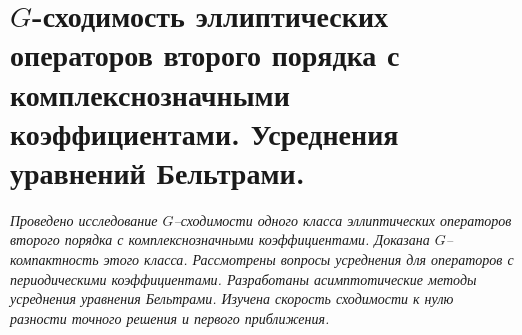 \section{$G$-сходимость эллиптических операторов второго порядка с комплекснозначными коэффициентами. Усреднения 
уравнений Бельтрами.}

\textit{Проведено исследование $G$--сходимости одного класса эллиптических операторов второго порядка с комплекснозначными коэффициентами. Доказана $G$--компактность этого класса. Рассмотрены вопросы усреднения для операторов с периодическими коэффициентами. Разработаны асимптотические методы усреднения уравнения Бельтрами. Изучена скорость сходимости к нулю разности точного решения и первого приближения.
}






